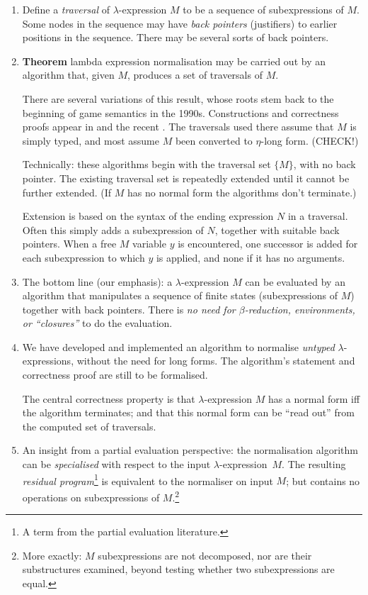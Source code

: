\documentclass{llncs}
\newcommand{\vair}{\vspace{3mm}}
\newcommand{\lexp}{$\lambda$-expression}
\begin{document}
\begin{enumerate}
\item Define a {\em traversal} of {\lexp} $M$ to be a sequence of subexpressions of $M$. Some nodes in the sequence may have {\em back pointers} (justifiers) to earlier positions in the sequence. 
There may be several sorts of back pointers.
\vair

\item {\bf Theorem} lambda expression normalisation may be carried out by an algorithm that, given $M$, produces a set of traversals of $M$. 
\smallskip

 
 There are several variations of this result, whose roots stem back to the beginning of game semantics in the 1990s. Constructions and correctness proofs appear in 
 \cite{DBLP:conf/tacs/AbramskyMJ94,lmcs09,blumong2008,DBLP:journals/iandc/HylandO00}
 and the recent \cite{ong2015}. The traversals used there assume that $M$ is simply typed, and most assume $M$ been converted to $\eta$-long form. (CHECK!)
\smallskip

Technically: these algorithms begin with the traversal set $\{M\}$, with no back pointer.
The existing traversal set is  repeatedly extended until it cannot be further extended.
(If $M$ has no normal form the algorithms don't terminate.)

Extension is based on the syntax of the ending expression $N$ in a traversal.
Often this simply adds a subexpression of $N$, together with suitable back pointers.
When a free $M$ variable $y$ is encountered, one successor is added for each subexpression to which $y$ is applied, and none if it has no arguments. 
\vair 

\item The bottom line (our emphasis): a {\lexp} $M$ can be evaluated by an algorithm that manipulates a sequence of finite states (subexpressions of $M$) together with back pointers. There is {\em no need for $\beta$-reduction, environments, or ``closures''} to do the evaluation.
\vair

\item We have developed and implemented an algorithm to normalise {\em untyped} {\lexp}s, without the need for  long forms. The algorithm's  statement and correctness proof are still to be formalised. 

The central correctness property is that  {\lexp} $M$ has a normal form iff the algorithm terminates; and that this normal form can be ``read out'' from the computed set of  traversals.
\vair 
 

\item An insight from a partial evaluation perspective: the normalisation algorithm can be {\em specialised} with respect to the input \lexp\ $M$. The resulting 
{\em residual 
program}\footnote{A  term from the partial evaluation literature.}
is equivalent to the normaliser on input $M$; but contains no operations on subexpressions 
of $M$.\footnote{More exactly: $M$ subexpressions are not decomposed, nor are their substructures examined, beyond testing whether two subexpressions are equal.
}
\vair


\end{enumerate}
\end{document}
